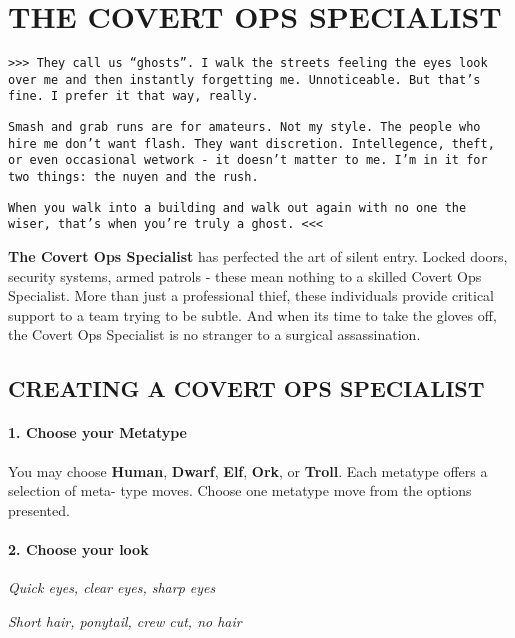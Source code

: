 
\section{THE COVERT OPS SPECIALIST}
\begin{multicols}{3}
\setlength{\parskip}{.05cm}

\texttt{>>> They call us ``ghosts''. I walk the streets feeling the eyes
  look over me and then instantly forgetting
  me. Unnoticeable. But that's fine. I prefer it
  that way, really. }

\texttt{Smash and grab runs are for amateurs. Not
my style. The people who hire me don't want
flash. They want discretion. Intellegence, theft,
or even occasional wetwork - it doesn't matter to
me. I'm in it for two things: the nuyen and the rush.}

\texttt{When you walk into a building and walk out
again with no one the wiser, that's when you're
truly a ghost. <<<}

\textbf{The Covert Ops Specialist} has perfected
the art of silent entry. Locked doors, security
systems, armed patrols -  these mean nothing to a
skilled Covert Ops Specialist. More than just a
professional thief, these individuals provide
critical support to a team trying to be
subtle. And when its time to take the gloves off,
the Covert Ops Specialist is no stranger to a
surgical assassination.


\subsection{CREATING A COVERT OPS SPECIALIST}

\paragraph{1.  Choose your Metatype}

You may choose \textbf{Human}, \textbf{Dwarf}, \textbf{Elf}, \textbf{Ork}, or
\textbf{Troll}. Each metatype offers a selection of meta-
type moves. Choose one metatype move from
the options presented.

\paragraph{2.  Choose your look}

\textit{Quick eyes, clear eyes, sharp eyes}

\textit{Short hair, ponytail, crew cut, no hair}


\end{multicols}
